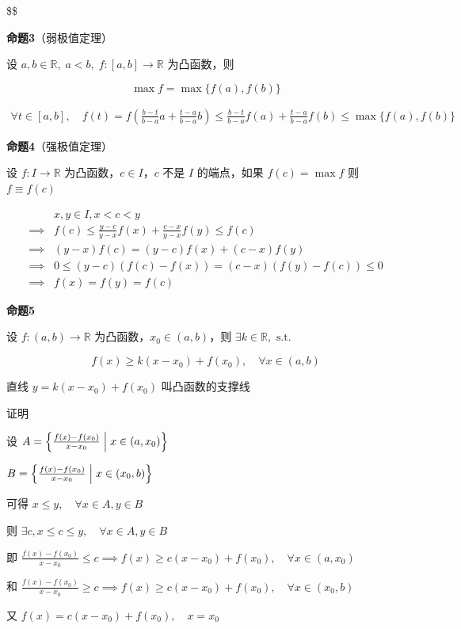\$\$

\textbf{命题3}（弱极值定理）

设 \(a, b\in \mathbb{R},\; a<b, \; f:[a,b]\to \mathbb{R}\) 为凸函数，则

\[
\max f = \max \{  f(a), f(b) \}
\]

\[
\begin{aligned}
\forall t\in [a, b], \quad f(t)=f\left( \frac{b-t}{b-a}a+\frac{t-a}{b-a}b \right)\leq \frac{b-t}{b-a}f(a)+\frac{t-a}{b-a}f(b)\leq \max \{ f(a),f(b) \}
\end{aligned}
\]

\textbf{命题4}（强极值定理）

设 \(f:I\to \mathbb{R}\) 为凸函数，\(c \in I\)，\(c\) 不是 \(I\)
的端点，如果 \(f(c)=\max f\) 则 \(f \equiv f(c)\)

\[
\begin{aligned}
&x, y \in I, x<c<y \\ 
\implies &f(c)  \leq \frac{y-c}{y-x}f(x)  + \frac{c-x}{y-x}f(y)\leq f(c) \\
\implies &(y-x)f(c)=(y-c)f(x)+(c-x)f(y) \\ 
\implies &0\leq(y-c)(f(c)-f(x)) = (c-x)(f(y)-f(c))\leq 0 \\
\implies &f(x)=f(y)=f(c)
\end{aligned}
\]

\textbf{命题5}

设 \(f:(a,b)\to \mathbb{R}\) 为凸函数，\(x_{0}\in (a,b)\)，则
\(\exists k \in \mathbb{R},\text{ s.t. }\)

\[
f(x)\geq k(x-x_{0})+f(x_{0}), \quad \forall x \in (a, b)
\]

直线 \(y=k(x-x_{0})+f(x_{0})\) 叫凸函数的支撑线

证明

设
\(A= \left\{   \frac{f(x)-f(x_{0})}{x-x_{0}} \Bigm| x \in (a, x_{0}) \right\}\)

\(B=\left\{  \frac{f(x)-f(x_{0})}{x-x_{0}} \Bigm| x \in (x_{0}, b) \right\}\)

可得 \(x\leq y, \quad \forall x \in A, y\in B\)

则 \(\exists c, x\leq c\leq y, \quad \forall x \in A, y \in B\)

即
\(\frac{f(x)-f(x_{0})}{x-x_{0}}\leq c \implies f(x) \geq c(x-x_{0})+f(x_{0}), \quad \forall x \in (a,x_{0})\)

和
\(\frac{f(x)-f(x_{0})}{x-x_{0}} \geq c \implies f(x) \geq c(x-x_{0})+f(x_{0}), \quad \forall x \in (x_{0}, b)\)

又 \(f(x)=c(x-x_{0})+f(x_{0}), \quad x=x_{0}\)

